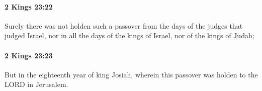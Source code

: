 		\paragraph{2 Kings 23:22} %
			\label{2KINGS-23-22}

			Surely there was not holden such a passover from the days of the judges that judged Israel, nor in all the days of the kings of Israel, nor of the kings of Judah;


		\paragraph{2 Kings 23:23} %
			\label{2KINGS-23-23}

			But in the eighteenth year of king Josiah, wherein this passover was holden to the LORD in Jerusalem.


